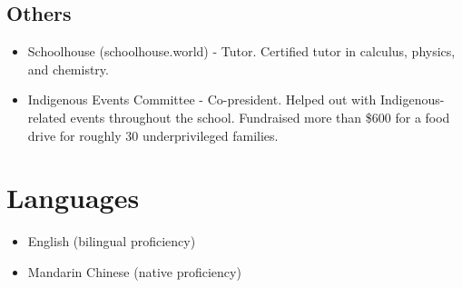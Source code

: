 \documentclass{article}
\begin{document}
\subsection*{Others}
\begin{itemize}
	\item Schoolhouse (schoolhouse.world) - Tutor. Certified tutor in calculus, physics, and chemistry.
	\item Indigenous Events Committee - Co-president. Helped out with Indigenous-related events throughout the school. Fundraised more than \$600 for a food drive for roughly 30 underprivileged families.
\end{itemize}

\section*{Languages}

\begin{itemize}
	\item English (bilingual proficiency)
	\item Mandarin Chinese (native proficiency)
\end{itemize}
\end{document}
